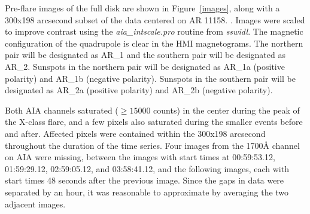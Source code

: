 Pre-flare images of the full disk are shown in Figure~\ref{images},
along with a 300x198 arcsecond subset of the data centered on AR 11158.
\citep{McAteer2003,McAteer2004}.
Images were scaled to improve contrast using the
\textit{aia\_intscale.pro} routine from \textit{sswidl}.
The magnetic configuration of the quadrupole is clear in the HMI magnetograms.
The northern pair will be designated as AR\_1
and the southern pair will be designated as AR\_2.
Sunspots in the northern pair will be designated as AR\_1a (positive polarity)
and AR\_1b (negative polarity).
Sunspots in the southern pair will be designated as AR\_2a (positive polarity)
and AR\_2b (negative polarity).

Both AIA channels saturated ($\geq\!15000$ counts) in the center
during the peak of the X-class flare, and a few pixels also saturated
during the smaller events before and after.
Affected pixels were  contained within the
300x198 arcsecond 
throughout the duration of the time series.
Four images from the 1700\AA{} channel on AIA were missing, between
the images with start times at
00:59:53.12,
01:59:29.12,
02:59:05.12, and
03:58:41.12, and the following images, each with start times
48 seconds after the previous image.
Since the gaps in data were separated by an hour,
it was reasonable to approximate 
by averaging the two adjacent images.
